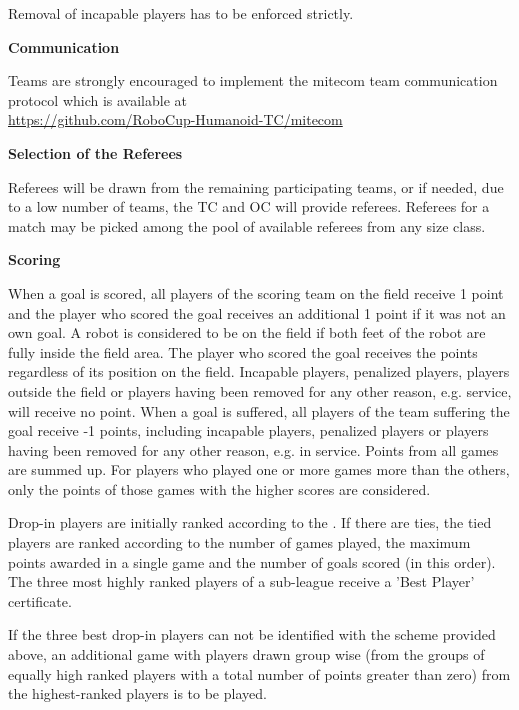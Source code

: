 Removal of incapable players has to be enforced strictly.

\bigskip
 
{\bfseries Communication}

Teams are strongly encouraged to implement the mitecom team communication protocol which is available at \\
\url{https://github.com/RoboCup-Humanoid-TC/mitecom} 

\bigskip
 
{\bfseries Selection of the Referees}

Referees will be drawn from the remaining participating teams, or if needed,
due to a low number of teams, the TC and OC will provide referees.
Referees for a match may be picked among the pool of available referees from any size class.

\bigskip
 
{\bfseries Scoring}

When a goal is scored, all players of the scoring team on the field receive 1 point and the player who scored the goal receives an additional 1 point if it was not an own goal. A robot is considered to be on the field if both feet of the robot are fully inside the field area. The player who scored the goal receives the points regardless of its position on the field. Incapable players, penalized players, players outside the field or players having been removed for any other reason, e.g. service, will receive no point. When a goal is suffered, all players of the team suffering the goal receive -1 points, including incapable players, penalized players or players having been removed for any other reason, e.g. in service. Points from all games are summed up. For players who played one or more games more than the others, only the points of those games with the higher scores are considered.

Drop-in players are initially ranked according to the 
.
If there are ties, the tied players are ranked according to
 the number of games played,
the maximum points awarded in a single game and the number of goals scored (in
this order).
The three most highly ranked players of a sub-league receive a 'Best Player' certificate.

If the three best drop-in players can not be identified with the scheme provided above, an additional game with players drawn group wise (from the groups of equally high ranked players with a total number of points greater than zero) from the highest-ranked players is to be played.

